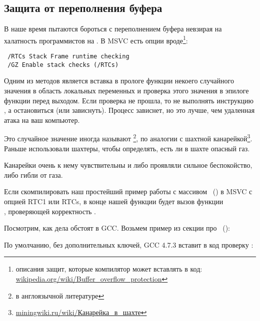 \subsection{Защита от переполнения буфера}
\label{subsec:BO_protection}

В наше время пытаются бороться с переполнением буфера невзирая на халатность программистов на \CCpp. 
В MSVC есть опции вроде\footnote{описания защит, которые компилятор может вставлять в код:
\href{http://go.yurichev.com/17133}{wikipedia.org/wiki/Buffer\_overflow\_protection}}:

\begin{lstlisting}
 /RTCs Stack Frame runtime checking
 /GZ Enable stack checks (/RTCs)
\end{lstlisting}

Одним из методов является вставка в прологе функции некоего случайного значения в область локальных переменных 
и проверка этого значения в эпилоге функции перед выходом. 
Если проверка не прошла, то не выполнять инструкцию \RET, а остановиться (или зависнуть). 
Процесс зависнет, но это лучше, чем удаленная атака на ваш компьютер.

\newcommand{\CANARYURL}{\href{http://go.yurichev.com/17135}{miningwiki.ru/wiki/Канарейка\_в\_шахте}}

Это случайное значение иногда называют 
\footnote{ в англоязычной литературе}, 
по аналогии с шахтной канарейкой\footnote{\CANARYURL}.
Раньше использовали шахтеры, чтобы определять, есть ли в шахте опасный газ.

Канарейки очень к нему чувствительны и либо проявляли сильное беспокойство, либо гибли от газа.

Если скомпилировать наш простейший пример работы с массивом ~() в \ac{MSVC}
с опцией RTC1 или RTCs,
в конце нашей функции будет вызов функции \\
, проверяющей корректность .

Посмотрим, как дела обстоят в GCC. 
Возьмем пример из секции про ~():



По умолчанию, без дополнительных ключей, GCC 4.7.3 вставит в код проверку :



